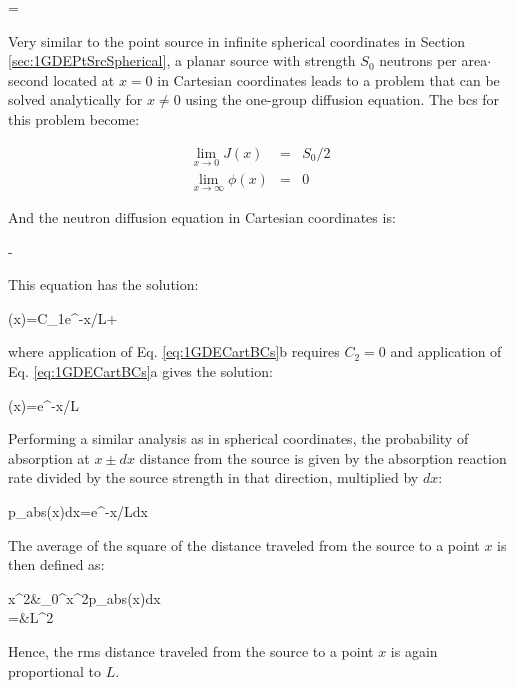 \beq
{}=
\eeq


Very similar to the point source in infinite spherical coordinates in Section \ref{sec:1GDEPtSrcSpherical}, a planar source with strength \(S_0\) neutrons per area\(\cdot\)second located at \(x=0\) in Cartesian coordinates leads to a problem that can be solved analytically for \(x\neq0\) using the one-group diffusion equation. The \glspl{bc} for this problem become:

\begin{subequations}
\label{eq:1GDECartBCs}
\begin{eqnarray}
\lim_{x\rightarrow0}J(x)&=&S_0/2\\
\lim_{x\rightarrow\infty}\phi(x)&=&0
\end{eqnarray}
\end{subequations}

And the neutron diffusion equation in Cartesian coordinates is:

\beq
{}-
\eeq

This equation has the solution:

\beq
\phi(x)=C_1e^{-x/L}+
\eeq

where application of Eq. \eqref{eq:1GDECartBCs}b requires \(C_2=0\) and application of Eq. \eqref{eq:1GDECartBCs}a gives the solution:

\beq
\phi(x)=e^{-x/L}
\eeq

Performing a similar analysis as in spherical coordinates, the probability of absorption at \(x\pm dx\) distance from the source is given by the absorption reaction rate divided by the source strength in that direction, multiplied by \(dx\):

\beq
p_{abs}(x)dx=e^{-x/L}dx
\eeq

The average of the square of the distance traveled from the source to a point \(x\) is then defined as:

\beqa
\langle x^2\rangle\equiv&\int_0^\infty x^2p_{abs}(x)dx\\
=&L^2
\eeqa

Hence, the \gls{rms} distance traveled from the source to a point \(x\) is again proportional to \(L\).


